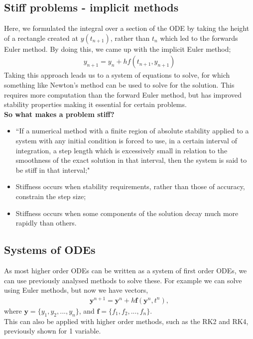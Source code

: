 \documentclass[11pt,a4paper]{report}
\begin{document}
	\subsection{Stiff problems - implicit methods}
	Here, we formulated the integral over a section of the ODE by taking the height of a rectangle created at $y(t_{n+1})$, rather than $t_n$ which led to the forwards Euler method. By doing this, we came up with the implicit Euler method;
	\begin{align}
	y_{n+1} = y_n + h f(t_{n+1}, y_{n+1})
	\end{align}
	Taking this approach leads us to a system of equations to solve, for which something like Newton's method can be used to solve for the solution. This requires more computation than the forward Euler method, but has improved stability properties making it essential for certain problems.\\
	\textbf{So what makes a problem stiff?} 
	\begin{itemize}
		\item ``If a numerical method with a  finite region of absolute stability applied to a system with any initial condition is forced to use, in a certain interval of integration, a step length which is excessively small in relation to the smoothness of the exact solution in that interval, then the system is said to be stiff in that interval;"
		\item  Stiffness occurs when stability requirements, rather than those of accuracy, constrain the step size;
		\item Stiffness occurs when some components of the solution decay much more rapidly than others.
	\end{itemize}
	\subsection{Systems of ODEs}
	As most higher order ODEs can be written as a system of first order ODEs, we can use previously analysed methods to solve these. For example we can solve using Euler methods, but now we have vectors,
	\newcommand{\bm}{\mathbf}
	\newcommand{\np}{^{n+1}}
	\begin{align}
	\bm{y}\np = \bm{y}^n + h \bm{f} ( \bm{y}^n, t^n),
	\end{align}
	where $\bm{y}=\{y_1,y_2,...,y_n\}$, and $\bm{f}=\{f_1,f_2,...,f_n\}$. \\
	
	This can also be applied with higher order methods, such as the RK2 and RK4, previously shown for 1 variable.
\end{document}
